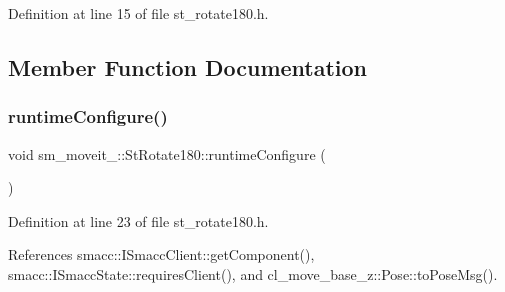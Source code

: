 Definition at line 15 of file st\+\_\+rotate180.\+h.



\subsection{Member Function Documentation}
\mbox{\label{structsm__moveit__3_1_1StRotate180_a9669445b3273306a66e49d720336bfbf}} 
\subsubsection{\texorpdfstring{runtime\+Configure()}{runtimeConfigure()}}
{\footnotesize\ttfamily void sm\+\_\+moveit\+\_\+::\+St\+Rotate180\+::runtime\+Configure (\begin{DoxyParamCaption}{ }\end{DoxyParamCaption})\hspace{0.3cm}{\ttfamily [inline]}}



Definition at line 23 of file st\+\_\+rotate180.\+h.



References smacc\+::\+I\+Smacc\+Client\+::get\+Component(), smacc\+::\+I\+Smacc\+State\+::requires\+Client(), and cl\+\_\+move\+\_\+base\+\_\+z\+::\+Pose\+::to\+Pose\+Msg().


